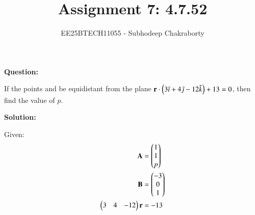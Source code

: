 \documentclass[journal,12pt,onecolumn]{IEEEtran}
\theoremstyle{remark}
\begin{document}

\vspace{3cm}

\title{Assignment 7: 4.7.52}
\author{EE25BTECH11055 - Subhodeep Chakraborty}
\maketitle
\hrulefill
\bigskip

\renewcommand{\thefigure}{\theenumi}
\renewcommand{\thetable}{\theenumi}

\textbf{Question:}\par
If the points  and  be equidistant from the plane $\mathbf{r}\cdot\left(3\hat{\imath} + 4\hat{\jmath} -12\hat{k}\right)+13=0$, then find the value of $p$.
\par
\textbf{Solution:}\par

Given:
\begin{align}
 \mathbf{A} &= \begin{pmatrix}1\\1\\p\end{pmatrix} \\
 \mathbf{B} &= \begin{pmatrix}-3\\0\\1\end{pmatrix}\\
 \begin{pmatrix}3 & 4 & -12\end{pmatrix}\mathbf{r} &= -13
\end{align}
\end{document}
